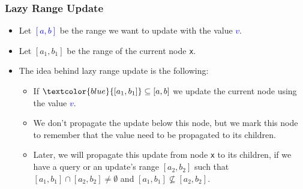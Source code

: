 \documentclass{beamer}
\begin{document}
\begin{frame}%
\frametitle{Lazy Range Update}

\begin{itemize}

\item Let \textcolor{blue}{$[a,b]$} be the range we want to update with the value \textcolor{blue}{$v$}.

\vspace{0.2cm}

\item<2-> Let $[a_1,b_1]$ be the range of the current node \texttt{x}.

\vspace{0.2cm}

\item<3-> The idea behind lazy range update is the following:
\begin{itemize}

\item<3-> If $\textcolor{blue}{[a_1,b_1]} \subseteq [a,b]$ we update the current node using the value \textcolor{blue}{$v$}.

\vspace{0.08cm}

\item<4-> We don't propagate the update below this
node, but we mark this node to remember that the value need to be propagated to its children.

\vspace{0.08cm}

\item<5-> Later, we will propagate this update from node \texttt{x} to its children, if we have a query or an update's range $[a_2,b_2]$ such that
$[a_1, b_1] \cap [a_2, b_2] \ne \emptyset$ and $[a_1, b_1] \not\subseteq [a_2, b_2]$.

\end{itemize}

\end{itemize}

\end{frame}
\end{document}
